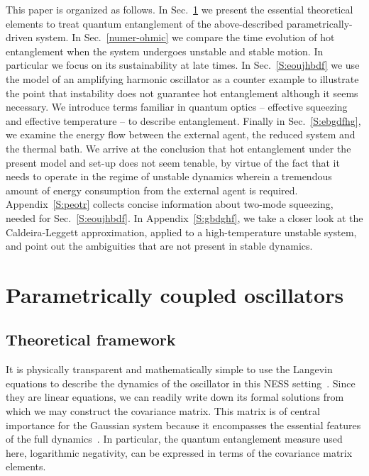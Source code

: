 \documentclass[11pt,a4paper]{article}
\begin{document}
This paper is organized as follows. In Sec.~\ref{S:ebtgdfg} we present the essential theoretical elements to treat quantum entanglement of the above-described parametrically-driven system. In Sec.~\ref{numer-ohmic} we compare the time evolution of hot entanglement when the system undergoes unstable and stable motion. In particular we focus on its sustainability at late times. In Sec.~\ref{S:eoujhbdf} we use the model of an amplifying harmonic oscillator as a counter example to illustrate the point that instability does not guarantee hot entanglement although it seems necessary. We introduce terms familiar in quantum optics -- effective squeezing and effective temperature -- to describe entanglement. Finally in Sec.~\ref{S:ebgdfhg}, we examine the energy flow between the external agent, the reduced system and the thermal bath. We arrive at the conclusion that hot entanglement under the present model and set-up \cite{galve-prl} does not seem tenable, by virtue of the fact that it needs to operate in the regime of unstable dynamics wherein a tremendous amount of energy consumption from the external agent is required.  Appendix~\ref{S:peotr} collects concise information about two-mode squeezing, needed for Sec.~\ref{S:eoujhbdf}. In Appendix~\ref{S:gbdghf}, we take a closer look at the Caldeira-Leggett approximation, applied to a high-temperature unstable system, and point out the ambiguities that are not present in stable dynamics.


\section{Parametrically coupled oscillators}\label{S:ebtgdfg}

\subsection{Theoretical framework}

It is physically transparent and mathematically simple to use the Langevin equations to describe the dynamics of the oscillator in this NESS setting~\cite{HH15AOP}. Since they are linear equations, we can readily write down its formal solutions from which we may construct the covariance matrix. This matrix is of central importance for the Gaussian system because it encompasses the essential features of the full dynamics~\cite{Peres, Horod, PPTSimon, Adesso, Adesso05, Illuminati04}. In particular, the quantum entanglement measure used here, logarithmic negativity, can be expressed in terms of the covariance matrix elements.
\end{document}
